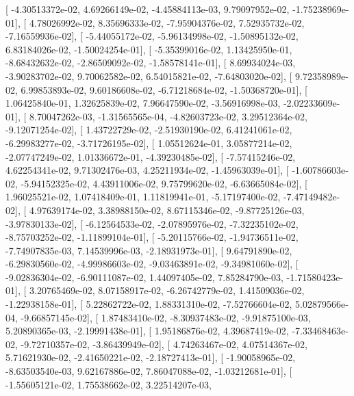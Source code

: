 \documentclass{article}
\begin{document}
       [ -4.30513372e-02,   4.69266149e-02,  -4.45884113e-03,
          9.79097952e-02,  -1.75238969e-01],
       [  4.78026992e-02,   8.35696333e-02,  -7.95904376e-02,
          7.52935732e-02,  -7.16559936e-02],
       [ -5.44055172e-02,  -5.96134998e-02,  -1.50895132e-02,
          6.83184026e-02,  -1.50024254e-01],
       [ -5.35399016e-02,   1.13425950e-01,  -8.68432632e-02,
         -2.86509092e-02,  -1.58578141e-01],
       [  8.69934024e-03,  -3.90283702e-02,   9.70062582e-02,
          6.54015821e-02,  -7.64803020e-02],
       [  9.72358989e-02,   6.99853893e-02,   9.60186608e-02,
         -6.71218684e-02,  -1.50368720e-01],
       [  1.06425840e-01,   1.32625839e-02,   7.96647590e-02,
         -3.56916998e-03,  -2.02233609e-01],
       [  8.70047262e-03,  -1.31565565e-04,  -4.82603723e-02,
          3.29512364e-02,  -9.12071254e-02],
       [  1.43722729e-02,  -2.51930190e-02,   6.41241061e-02,
         -6.29983277e-02,  -3.71726195e-02],
       [  1.05512624e-01,   3.05877214e-02,  -2.07747249e-02,
          1.01336672e-01,  -4.39230485e-02],
       [ -7.57415246e-02,   4.62254341e-02,   9.71302476e-03,
          4.25211934e-02,  -1.45963039e-01],
       [ -1.60786603e-02,  -5.94152325e-02,   4.43911006e-02,
          9.75799620e-02,  -6.63665084e-02],
       [  1.96025521e-02,   1.07418409e-01,   1.11819941e-01,
         -5.17197400e-02,  -7.47149482e-02],
       [  4.97639174e-02,   3.38988150e-02,   8.67115346e-02,
         -9.87725126e-03,  -3.97830133e-02],
       [ -6.12564533e-02,  -2.07895976e-02,  -7.32235102e-02,
         -8.75703252e-02,  -1.11899104e-01],
       [ -5.20115766e-02,  -1.94736511e-02,  -7.74907835e-03,
          7.14539996e-03,  -2.18931973e-01],
       [  9.64791890e-02,  -6.29830560e-02,  -4.99986603e-02,
         -9.03463891e-02,  -9.34981060e-02],
       [ -9.02836304e-02,  -6.90111087e-02,   1.44097405e-02,
          7.85284790e-03,  -1.71580423e-01],
       [  3.20765469e-02,   8.07158917e-02,  -6.26742779e-02,
          1.41509036e-02,  -1.22938158e-01],
       [  5.22862722e-02,   1.88331310e-02,  -7.52766604e-02,
          5.02879566e-04,  -9.66857145e-02],
       [  1.87483410e-02,  -8.30937483e-02,  -9.91875100e-03,
          5.20890365e-03,  -2.19991438e-01],
       [  1.95186876e-02,   4.39687419e-02,  -7.33468463e-02,
         -9.72710357e-02,  -3.86439949e-02],
       [  4.74263467e-02,   4.07514367e-02,   5.71621930e-02,
         -2.41650221e-02,  -2.18727413e-01],
       [ -1.90058965e-02,  -8.63503540e-03,   9.62167886e-02,
          7.86047088e-02,  -1.03212681e-01],
       [ -1.55605121e-02,   1.75538662e-02,   3.22514207e-03,
\end{document}
